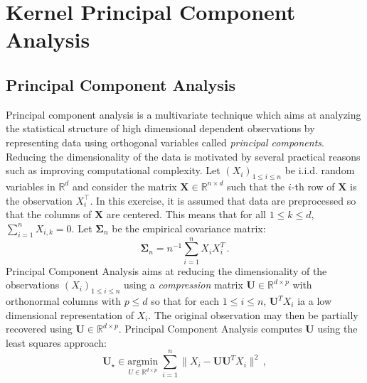 \documentclass[a4paper,10pt,fleqn]{article}
\newcommand{\eqsp}{\,}
\newcommand{\rset}{\ensuremath{\mathbb{R}}}
\newcommand{\1}{\ensuremath{\mathbbm{1}}}
\newcommand{\bfU}{\mathbf{U}}
\newcommand{\bfX}{\mathbf{X}}
\newcommand{\bfs}{\mathbf{\Sigma}}
\begin{document}
\section*{Kernel Principal Component Analysis}
\subsection*{Principal Component Analysis}
Principal component analysis is a multivariate technique which aims at analyzing the statistical structure of high dimensional dependent observations by representing data using orthogonal variables called {\em principal components}. Reducing the dimensionality of the data is motivated by several practical reasons such as improving computational complexity. Let $(X_i)_{1\leqslant i\leqslant n}$ be i.i.d. random variables in $\rset^d$ and consider the matrix $\bfX\in\rset^{n\times d}$ such that the $i$-th row of $\bfX$ is the observation $X^\top_i$. In this exercise, it is assumed that data are preprocessed so that the columns of $\bfX$ are centered.  This means that for all $1\leqslant k \leqslant d$, $\sum_{i=1}^{n}X_{i,k} = 0$. Let $\bfs_n$ be the empirical covariance matrix:
$$
\bfs_n = n^{-1}\sum_{i=1}^n X_i X^T_i\eqsp.
$$
Principal Component Analysis  aims at reducing the dimensionality of the observations $(X_i)_{1\leqslant i \leqslant n}$ using a {\em compression} matrix $\bfU\in \rset^{d\times p}$ with orthonormal columns with $p\leqslant d$ so that for each $1\leqslant i \leqslant n$, $\bfU^TX_i$ ia a low dimensional representation of $X_i$. The original observation may then be partially recovered using  $\bfU\in \rset^{d\times p}$. Principal Component Analysis computes $\bfU$ using the least squares approach:
$$
\bfU_{\star} \in \underset{U\in  \rset^{d\times p}}{\mathrm{argmin}} \;\sum_{i=1}^n\|X_i - \bfU\bfU^TX_i\|^2\eqsp,
$$
\end{document}
